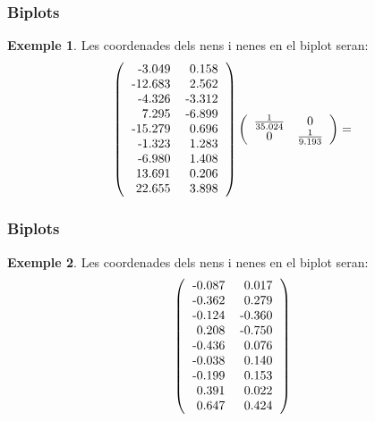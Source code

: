 \documentclass[12pt,t]{beamer}
\theoremstyle{plain}
\theoremstyle{definition}
\newtheorem{exemple}{Exemple}
\begin{document}
\begin{frame}
\frametitle{Biplots}
\begin{exemple}
Les coordenades dels nens i nenes en el biplot seran:
\[
\left(
\begin{tabular}{rr}
  -3.049 & 0.158 \\ 
  -12.683 & 2.562 \\ 
  -4.326 & -3.312 \\ 
  7.295 & -6.899 \\ 
  -15.279 & 0.696 \\ 
  -1.323 & 1.283 \\ 
  -6.980 & 1.408 \\ 
  13.691 & 0.206 \\ 
  22.655 & 3.898 \\ 
  \end{tabular}\right)
\left(
\begin{array}{cc}
\frac{1}{35.024}&0\\
0&\frac{1}{9.193}
\end{array}
\right)=
\]
\end{exemple}
\end{frame}


\begin{frame}
\frametitle{Biplots}
\begin{exemple}
Les coordenades dels nens i nenes en el biplot seran:
\[
\left(
\begin{tabular}{rr}
  -0.087 & 0.017 \\ 
  -0.362 & 0.279 \\ 
  -0.124 & -0.360 \\ 
  0.208 & -0.750 \\ 
  -0.436 & 0.076 \\ 
  -0.038 & 0.140 \\ 
  -0.199 & 0.153 \\ 
  0.391 & 0.022 \\ 
  0.647 & 0.424 \\ 
  \end{tabular}\right)
\]
\end{exemple}
\end{frame}
\end{document}

